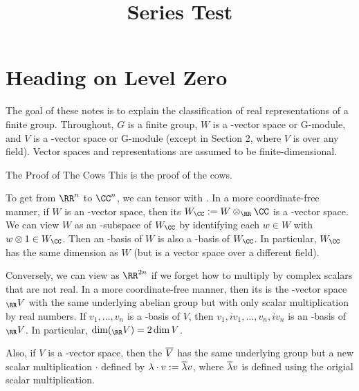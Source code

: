 \documentclass{scrartcl}
\title{\huge Series Test}
\begin{document}
\maketitle
\begin{abstract}
    \lipsum[1]
\end{abstract}


\section{Heading on Level Zero}

\rightmark The goal of these notes is to explain the classification of real representations of a finite
group. Throughout, $G$ is a finite group, $W$ is a \RR-vector space or \RR G-module, and $V$ is a
\CC-vector space or \CC G-module (except in Section 2, where $V$ is over any field). Vector spaces
and representations are assumed to be finite-dimensional.

\begin{subproof*}{The Proof of The Cows}
This is the proof of the cows.
\end{subproof*}

To get from $\RR^n$ to $\CC^n$, we can tensor with \CC. In a more coordinate-free
manner, if $W$ is an \RR-vector space, then its  $W_{\CC} := W \otimes_{\RR} \CC$ is a \CC-vector
space. We can view $W$ as an \RR-subspace of $W_{\CC}$ by identifying each $w \in W$ with $w \otimes 1 \in W_{\CC}$.
Then an \RR-basis of $W$ is also a \CC-basis of $W_{\CC}$. In particular, $W_{\CC}$ has the same dimension as
$W$ (but is a vector space over a different field).

Conversely, we can view \CC[n] as $\RR^{2n}$ if we forget how to multiply by complex scalars that are not real. In a more coordinate-free manner, then its  is the \RR-vector space $_{\RR} V$ with the same underlying abelian group but with only scalar multiplication by real numbers. If $v_1,\dots,v_n$ is a \CC-basis of $V$, then $v_1, iv_1,\dots,v_n,iv_n$ is an \RR-basis of $_{\RR} V$. In particular, $\dim(_{\RR} V) = 2\dim V$.

Also, if $V$ is a \CC-vector space, then the  $\overline{V}$ has the same underlying group but a new scalar multiplication $\cdot$ defined by $\lambda\cdot v := \overline{\lambda}v$, where $\overline{\lambda}v$ is defined using the origial scalar multiplication.
\end{document}
